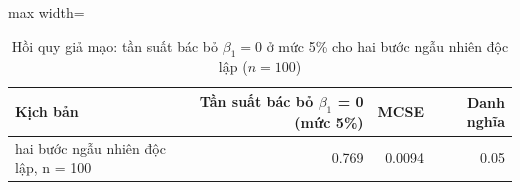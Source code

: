 \begin{table}[H]
\centering\small
\caption{Hồi quy giả mạo: tần suất bác bỏ $\beta_1=0$ ở mức 5\% cho hai bước ngẫu nhiên độc lập ($n=100$)}\label{tab:tab_b12_02_spurious_regression}
\begin{adjustbox}{max width=\linewidth}
\begin{tabular}{>{\raggedright\arraybackslash}p{}rrr}
\toprule
Kịch bản & Tần suất bác bỏ $\beta_{1}$ = 0 (mức 5\%) & MCSE & Danh nghĩa \\
\midrule
hai bước ngẫu nhiên độc lập, n = 100 & 0.769 & 0.0094 & 0.05 \\
\bottomrule
\end{tabular}
\end{adjustbox}
\end{table}
